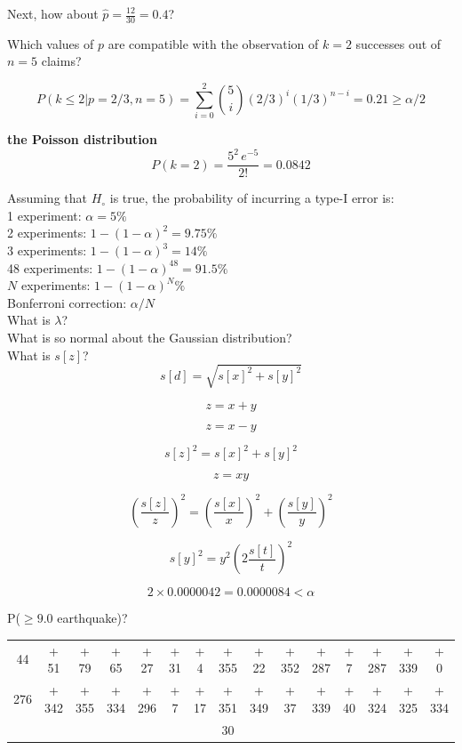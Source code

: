 \documentclass{article}
\begin{document}
Next, how about $\hat{p}=\frac{12}{30}=0.4$?

Which values of $p$ are compatible with the observation of $k=2$
successes out of $n=5$ claims?

\[
P({k}\leq{2}|p=2/3,n=5) =
\sum\limits_{i=0}^{2}\binom{5}{i}(2/3)^i(1/3)^{n-i} = 0.21 \geq \alpha/2
\]

\textbf{the Poisson distribution}\\

\[
P(k=2) = \dfrac{5^2\,e^{-5}}{2!} = 0.0842
\]

Assuming that $H_\circ$ is true, the probability of incurring a type-I
error is:\\

1 experiment: $\alpha = 5\%$\\

2 experiments: $1-(1-\alpha)^2=9.75\%$\\

3 experiments: $1-(1-\alpha)^3=14\%$\\

48 experiments:   $1-(1-\alpha)^{48}=91.5\%$\\

$N$ experiments:   $1-(1-\alpha)^{N}\%$\\

Bonferroni correction: $\alpha/N$\\

What is $\lambda$?\\

What is so normal about the Gaussian distribution?\\

What is $s[z]$?\\

\[
s[d] = \sqrt{s[x]^2 + s[y]^2}
\]

\[
z = x + y
\]

\[
z = x - y
\]

\[
s[z]^2 = s[x]^2 + s[y]^2
\]

\[
z = xy
\]

\[
\left(\frac{s[z]}{z}\right)^2 =
\left(\frac{s[x]}{x}\right)^2 + \left(\frac{s[y]}{y}\right)^2
\]

\[
s[y]^2 = y^2\left(2\frac{s[t]}{t}\right)^2
\]

\[
2 \times 0.0000042 = 0.0000084 < \alpha
\]

P($\geq{9.0}$ earthquake)?

\begin{center}
\begin{tabular}{c@{~}c@{~}c@{~}c@{~}c@{~}c@{~}c@{~}c@{~}c@{~}c@{~}c@{~}c@{~}c@{~}c@{~}c}
  44 & + 51 & + 79 & + 65 & + 27 & + 31 & + 4 & + 355 & +
  22 & + 352 & + 287 & + 7 & + 287 & + 339 & + 0 \\
  276 & + 342 & + 355 & + 334 & + 296 & + 7 & + 17 & +
  351 & + 349 & + 37 & + 339 & + 40 & + 324 & + 325 & + 334\\ \hline
  & & & & & & & 30 & & & & & & & 
\end{tabular}
\end{center}
\end{document}
